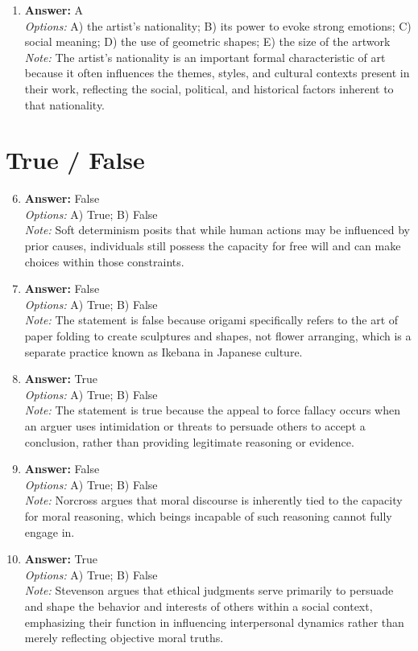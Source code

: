 \documentclass[12pt]{article}
\begin{document}
\begin{enumerate}[label=\arabic*.]
\\ \textit{Note:} Stevenson's primary aim in the paper is to clarify ethical questions by analyzing the language and concepts involved, thereby enhancing understanding and facilitating meaningful discourse on moral issues.
\item \textbf{Answer:} A
\\ \textit{Options:} A) the artist's nationality; B) its power to evoke strong emotions; C) social meaning; D) the use of geometric shapes; E) the size of the artwork
\\ \textit{Note:} The artist's nationality is an important formal characteristic of art because it often influences the themes, styles, and cultural contexts present in their work, reflecting the social, political, and historical factors inherent to that nationality.
\end{enumerate}

\section*{True / False}
\begin{enumerate}[label=\arabic*.]
\setcounter{enumi}{5}
\item \textbf{Answer:} False
\\ \textit{Options:} A) True; B) False
\\ \textit{Note:} Soft determinism posits that while human actions may be influenced by prior causes, individuals still possess the capacity for free will and can make choices within those constraints.
\item \textbf{Answer:} False
\\ \textit{Options:} A) True; B) False
\\ \textit{Note:} The statement is false because origami specifically refers to the art of paper folding to create sculptures and shapes, not flower arranging, which is a separate practice known as Ikebana in Japanese culture.
\item \textbf{Answer:} True
\\ \textit{Options:} A) True; B) False
\\ \textit{Note:} The statement is true because the appeal to force fallacy occurs when an arguer uses intimidation or threats to persuade others to accept a conclusion, rather than providing legitimate reasoning or evidence.
\item \textbf{Answer:} False
\\ \textit{Options:} A) True; B) False
\\ \textit{Note:} Norcross argues that moral discourse is inherently tied to the capacity for moral reasoning, which beings incapable of such reasoning cannot fully engage in.
\item \textbf{Answer:} True
\\ \textit{Options:} A) True; B) False
\\ \textit{Note:} Stevenson argues that ethical judgments serve primarily to persuade and shape the behavior and interests of others within a social context, emphasizing their function in influencing interpersonal dynamics rather than merely reflecting objective moral truths.
\end{enumerate}
\end{document}

